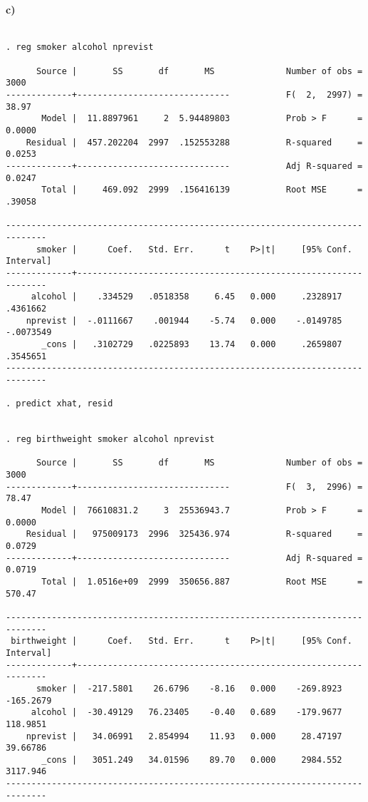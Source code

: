 \documentclass[letterpaper,12pt,titlepage,oneside,final]{book}
\begin{document}
\paragraph{c)}
\begin{verbatim}

. reg smoker alcohol nprevist

      Source |       SS       df       MS              Number of obs =    3000
-------------+------------------------------           F(  2,  2997) =   38.97
       Model |  11.8897961     2  5.94489803           Prob > F      =  0.0000
    Residual |  457.202204  2997  .152553288           R-squared     =  0.0253
-------------+------------------------------           Adj R-squared =  0.0247
       Total |     469.092  2999  .156416139           Root MSE      =  .39058

------------------------------------------------------------------------------
      smoker |      Coef.   Std. Err.      t    P>|t|     [95% Conf. Interval]
-------------+----------------------------------------------------------------
     alcohol |    .334529   .0518358     6.45   0.000     .2328917    .4361662
    nprevist |  -.0111667    .001944    -5.74   0.000    -.0149785   -.0073549
       _cons |   .3102729   .0225893    13.74   0.000     .2659807    .3545651
------------------------------------------------------------------------------

. predict xhat, resid


. reg birthweight smoker alcohol nprevist

      Source |       SS       df       MS              Number of obs =    3000
-------------+------------------------------           F(  3,  2996) =   78.47
       Model |  76610831.2     3  25536943.7           Prob > F      =  0.0000
    Residual |   975009173  2996  325436.974           R-squared     =  0.0729
-------------+------------------------------           Adj R-squared =  0.0719
       Total |  1.0516e+09  2999  350656.887           Root MSE      =  570.47

------------------------------------------------------------------------------
 birthweight |      Coef.   Std. Err.      t    P>|t|     [95% Conf. Interval]
-------------+----------------------------------------------------------------
      smoker |  -217.5801    26.6796    -8.16   0.000    -269.8923   -165.2679
     alcohol |  -30.49129   76.23405    -0.40   0.689    -179.9677    118.9851
    nprevist |   34.06991   2.854994    11.93   0.000     28.47197    39.66786
       _cons |   3051.249   34.01596    89.70   0.000     2984.552    3117.946
------------------------------------------------------------------------------


\end{verbatim}
\end{document}
